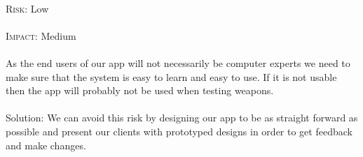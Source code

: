 \paragraph{}\textsc{Risk:} Low
\paragraph{}\textsc{Impact:} Medium
\paragraph{} As the end users of our app will not necessarily be computer experts we need to make sure that the system is easy to learn and easy to use. If it is not usable then the app will probably not be used when testing weapons.
\\
\\Solution: We can avoid this risk by designing our app to be as straight forward as possible and present our clients with prototyped designs in order to get feedback and make changes.
